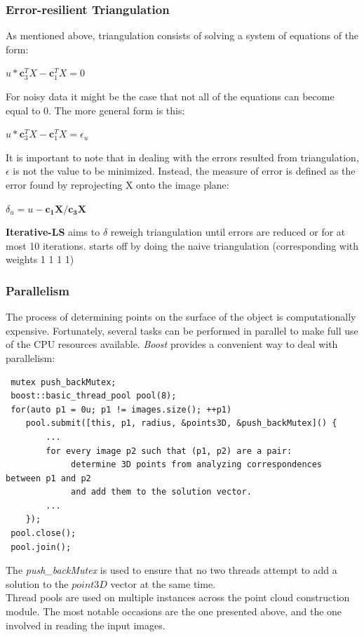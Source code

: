 \documentclass[12pt,a4paper,twoside,openright]{report}
\begin{document}
\subsubsection{Error-resilient Triangulation}
As mentioned above, triangulation consists of solving a system of equations of the form:\\
\begin{center}
$u * \mathbf{c}_{3}^TX - \mathbf{c}_{1}^TX=0$
\end{center}
For noisy data it might be the case that not all of the equations can become equal to 0. The more general form is this:
\begin{center}
$u * \mathbf{c}_{3}^TX - \mathbf{c}_{1}^TX=\epsilon_u$
\end{center}
It is important to note that in dealing with the errors resulted from triangulation, $\epsilon$ is not the value to be minimized. Instead, the measure of error is defined as the error found by reprojecting X onto the image plane:
\begin{center}
$\delta _u = u - \mathbf{c_1X/c_3X}$
\end{center}
\textbf{Iterative-LS}\cite[p.~9]{Hartley96triangulation} aims to  $\delta$
reweigh triangulation until errors are reduced or for at most 10 iterations.
starts off by doing the naive triangulation (corresponding with weights 1 1 1 1)

\subsubsection{Parallelism}
The process of determining points on the surface of the object is computationally expensive. Fortunately, several tasks can be performed in parallel to make full use of the CPU resources available. \emph{Boost} provides a convenient way to deal with parallelism: \\
\begin{verbatim}
 mutex push_backMutex;
 boost::basic_thread_pool pool(8);
 for(auto p1 = 0u; p1 != images.size(); ++p1)
    pool.submit([this, p1, radius, &points3D, &push_backMutex]() {
    	...
    	for every image p2 such that (p1, p2) are a pair:
    		 determine 3D points from analyzing correspondences between p1 and p2
    		 and add them to the solution vector.
    	...
    });
 pool.close();
 pool.join();
\end{verbatim}
The \emph{push\_backMutex} is used to ensure that no two threads attempt to add a solution to the $point3D$ vector at the same time.\\
Thread pools are used on multiple instances across the point cloud construction module. The most notable occasions are the one presented above, and the one involved in reading the input images.
\end{document}
